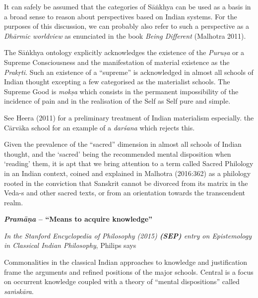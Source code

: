 It can safely be assumed that the categories of Sāṅkhya can be used as a basis in a broad sense to reason about perspectives based on Indian systems. For the purposes of this discussion, we can probably also refer to such a perspective as a {\sl Dhārmic worldview} as enunciated in the book {\sl Being Different} (Malhotra 2011).

The Sāṅkhya ontology explicitly acknowledges the existence of the {\sl Puruṣa} or a Supreme Consciousness and the manifestation of material existence as the {\sl Prakṛti}. Such an existence of a ``supreme'' is acknowledged in almost all schools of Indian thought excepting a few categorised as the materialist schools. The Supreme Good is {{\sl mokṣa}\relax} which consists in the permanent impossibility of the incidence of pain and in the realisation of the Self as Self pure and simple.

See Heera (2011) for a preliminary treatment of Indian materialism especially. the Cārvāka school for an example of a {\sl darśana} which rejects this.

Given the prevalence of the ``sacred'' dimension in almost all schools of Indian thought, and the `sacred' being the recommended mental disposition when `reading' them, it is apt that  we bring attention to a term called Sacred Philology in an Indian context, coined and explained in Malhotra  (2016:362) as a philology rooted in the conviction that Sanskrit cannot be divorced from its matrix in the Veda-s and other sacred texts, or from an orientation towards the transcendent realm.

{\bf {\sl\bfseries Pramāṇa}  -- ``Means to acquire knowledge''}

{\sl In the Stanford Encyclopedia of Philosophy (2015) {\bf(SEP)} entry on Epistemology in Classical Indian Philosophy}, Philips says
\begin{myquote}
Commonalities in the classical Indian approaches to knowledge and justification frame the arguments and refined positions of the major schools. Central is a focus on occurrent knowledge coupled with a theory of ``mental dispositions'' called {\sl saṁskāra}.
\end{myquote}

